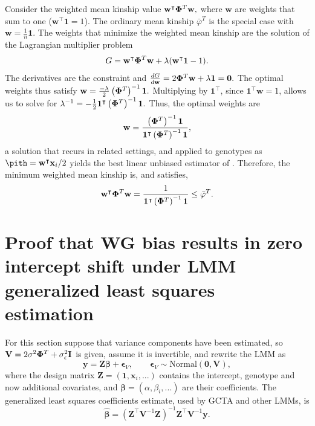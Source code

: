 \documentclass[11pt]{article}
\newcommand{\kinMat}[1][T]{%
  \ensuremath{%
    \mathbf{\Phi}^{#1}
  }%
  \xspace%
}%
\begin{document}
\begin{appendices}
  Consider the weighted mean kinship value
  $
  \mathbf{w}^\intercal \kinMat \mathbf{w},
  $
  where $\mathbf{w}$ are weights that sum to one ($\mathbf{w}^\intercal \mathbf{1} = 1$).
  The ordinary mean kinship $\bar{\varphi}^T$ is the special case with $\mathbf{w} = \frac{1}{n} \mathbf{1}$.
  The weights that minimize the weighted mean kinship are the solution of the Lagrangian multiplier problem
  $$
  G = \mathbf{w}^\intercal \kinMat \mathbf{w} + \lambda (\mathbf{w}^\intercal \mathbf{1} - 1).
  $$
  The derivatives are the constraint and
  $
  \frac{dG}{d \mathbf{w}}
  =
  2 \kinMat \mathbf{w} + \lambda \mathbf{1} = \mathbf{0}.
  $
  The optimal weights thus satisfy
  $
  \mathbf{w} = \frac{-\lambda}{2} \left( \kinMat \right)^{-1} \mathbf{1}.
  $
  Multiplying by $\mathbf{1}^\intercal$, since $\mathbf{1}^\intercal \mathbf{w} = 1$, allows us to solve for 
  $
  \lambda^{-1} = - \frac{1}{2} \mathbf{1}^\intercal \left( \kinMat \right)^{-1} \mathbf{1}.
  $
  Thus, the optimal weights are
  $$
  \mathbf{w}
  = 
  \frac{ \left( \kinMat \right)^{-1} \mathbf{1} }{ \mathbf{1}^\intercal \left( \kinMat \right)^{-1} \mathbf{1} }
  ,
  $$
  a solution that recurs in related settings, and applied to genotypes as $\pith = \mathbf{w}^\intercal \mathbf{x}_i / 2$ yields the best linear unbiased estimator of \pit \citep{altschul_weights_1989, astle_population_2009, thornton_roadtrips:_2010}.
  Therefore, the minimum weighted mean kinship is, and satisfies,
  $$
  \mathbf{w}^\intercal \kinMat \mathbf{w}
  =
  \frac{ 1 }{ \mathbf{1}^\intercal \left( \kinMat \right)^{-1} \mathbf{1} }
  \le
  \bar{\varphi}^T
  .
  $$
    
  \section{Proof that WG bias results in zero intercept shift under LMM generalized least squares estimation}

  \label{sec:wg_gls}

  For this section suppose that variance components have been estimated, so $\mathbf{V} = 2 \sigma^2 \kinMat + \sigma^2_\epsilon \mathbf{I}$ is given, assume it is invertible, and rewrite the LMM as
  $$
  \mathbf{y}
  =
  \mathbf{Z} \boldsymbol{\beta} + \boldsymbol{\epsilon}_V,
  \quad\quad
  \boldsymbol{\epsilon}_V \sim \text{Normal} \left( \mathbf{0}, \mathbf{V} \right),
  $$
  where the design matrix $\mathbf{Z} = (\mathbf{1}, \mathbf{x}_i, ...)$ contains the intercept, genotype and now additional covariates, and $\boldsymbol{\beta} = (\alpha, \beta_i, ...)$ are their coefficients.
  The generalized least squares coefficients estimate, used by GCTA and other LMMs, is
  $$
  \boldsymbol{\hat{\beta}} = \left( \mathbf{Z}^\intercal \mathbf{V}^{-1} \mathbf{Z} \right)^{-1} \mathbf{Z}^\intercal \mathbf{V}^{-1} \mathbf{y}.
  $$


\end{appendices}
\end{document}
